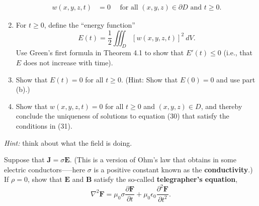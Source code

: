 \documentclass[12pt,letterpaper]{hmcpset}
\newcommand{\f}[2]{\frac{#1}{#2}}
\newcommand{\p}[2]{\frac{\partial#1}{\partial#2}}
\renewcommand{\bf}[1]{\mathbf{#1}}
\begin{document}
\begin{problem}[Colley 7.4.10]
\begin{enumerate}
\begin{align*}
                w(x,y,z,t)&=0\quad\text{ for all }(x,y,z)\in\partial D
                \text{ and }t\geq0.
            \end{align*}
        \item For $t\geq0$, define the ``energy function''
            \[
                E(t)=\f{1}{2}\iiint_D[w(x,y,z,t)]^2~dV.
            \]
            Use Green's first formula in Theorem 4.1 to show that
            $E'(t)\leq0$ (i.e., that $E$ does not increase with time).
        \item Show that $E(t)=0$ for all $t\geq0$. (Hint: Show that
            $E(0)=0$ and use part (b).)
        \item Show that $w(x,y,z,t)=0$ for all $t\geq0$ and $(x,
            y,z)\in D$, and thereby conclude the uniqueness of solutions
            to equation (30) that satisfy the conditions in (31).
    \end{enumerate}
    \textit{Hint:} think about what the field is doing.
\end{problem}
\newpage
\begin{solution}
    \null\vfill
\end{solution}
\newpage

\begin{problem}[Colley 7.4.18]
    Suppose that $\bf{J}=\sigma\bf{E}$. (This is a version of Ohm's
    law that obtains in some electric conductors—--here $\sigma$ is a
    positive constant known as the \textbf{conductivity}.) If
    $\rho=0$, show that $\bf{E}$ and $\bf{B}$ satisfy the so-called
    \textbf{telegrapher's equation},
    \[
        \nabla^2\bf{F}=\mu_0\sigma\p{\bf{F}}{t}
        +\mu_0\epsilon_0\p{^2\bf{F}}{t^2}.
    \]
\end{problem}
\begin{solution}
    \vfill
\end{solution}
\end{document}
